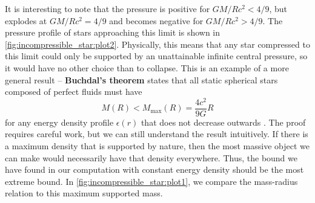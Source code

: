 It is interesting to note that the pressure is positive for $GM/Rc^2 < 4/9$, but explodes at $GM/Rc^2 = 4/9$ and becomes negative for $GM/Rc^2 > 4/9$.
The pressure profile of stars approaching this limit is shown in \cref{fig:incompressible_star:plot2}.
Physically, this means that any star compressed to this limit could only be supported by an unattainable infinite central pressure, so it would have no other choice than to collapse.
This is an example of a more general result -- \textbf{Buchdal's theorem} states that all static spherical stars composed of perfect fluids must have
\begin{equation}
	M(R) < M_\text{max}(R) = \frac{4c^2}{9G} R
	\label{eq:incompressible_star:buchdal}
\end{equation}
for any energy density profile $\epsilon(r)$ that does not decrease outwards \cite{ref:buchdal}.
The proof requires careful work, but we can still understand the result intuitively.
If there is a maximum density that is supported by nature, then the most massive object we can make would necessarily have that density everywhere.
Thus, the bound we have found in our computation with constant energy density should be the most extreme bound.
In \cref{fig:incompressible_star:plot1}, we compare the mass-radius relation to this maximum supported mass.

